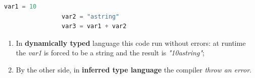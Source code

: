 \documentclass[12pt]{article}
\begin{document}
			\begin{lstlisting}[language=Python]
				var1 = 10
				var2 = "astring"
				var3 = var1 + var2
			\end{lstlisting}
			
			\begin{enumerate}
				\item In \textbf{dynamically typed} language this code run without errors: at runtime the \textit{var1} is forced to be a string and the result is \textit{"10astring"};
				\item By the other side, in \textbf{inferred type language} the compiler \textit{throw an error}.
			\end{enumerate}
		
		






		
\end{document}

